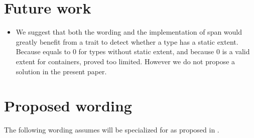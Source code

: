 \documentclass{wg21}
\begin{document}
\section{Future work}

\begin{itemize}
    \item We suggest that both the wording and the implementation of span would greatly benefit from a trait to detect whether a type has a static extent.
Because  equals to 0 for types without static extent, and because 0 is a valid extent for containers,  proved too limited. However we do not propose a solution in the present paper.
\end{itemize}

\section{Proposed wording}


The following wording assumes  will be specialized for  as proposed
in \cite{P1474}.  
\end{document}
